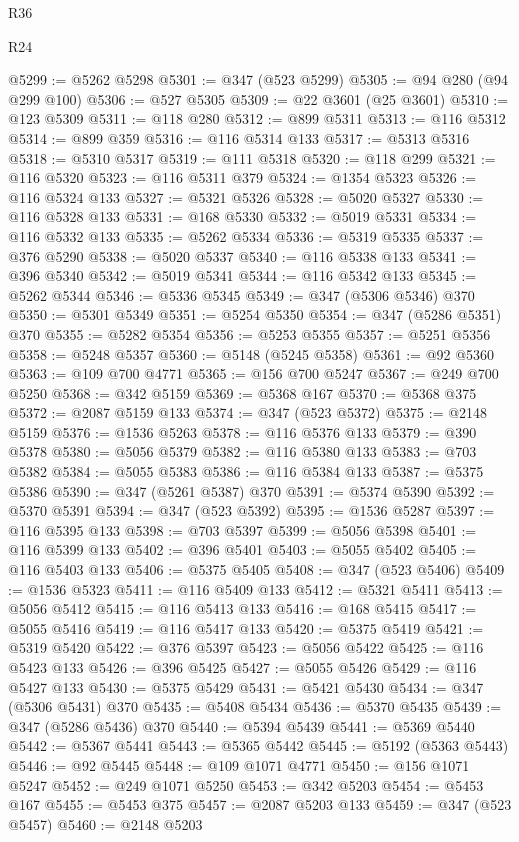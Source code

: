 \begin{lexlean}{R36}
\begin{lexlean}{R24}
\begin{coremodule}
{{{{{{{{{{{{{{{{{{{{{{{{{{{{{{{{{{{{{{{{{{{{{{{{{{{{{{{{{{{{{{{{{{{{{{{{{{{{{{{{{{{{{{{{{{{{{{{{{{{{{{{{{{{{{{{{{{{{{{{{{{{{{{{{{{{{{{{{{{{{{{{{{{{{{{{{{{{{{{{{{{{{{{{{{{{{{{{{{{{{{{{{{{{{{{{{{{{@5299 := @5262 @5298
@5301 := @347 (@523 @5299)
@5305 := @94 @280 (@94 @299 @100)
@5306 := @527 @5305
@5309 := @22 @3601 (@25 @3601)
@5310 := @123 @5309
@5311 := @118 @280
@5312 := @899 @5311
@5313 := @116 @5312
@5314 := @899 @359
@5316 := @116 @5314 @133
@5317 := @5313 @5316
@5318 := @5310 @5317
@5319 := @111 @5318
@5320 := @118 @299
@5321 := @116 @5320
@5323 := @116 @5311 @379
@5324 := @1354 @5323
@5326 := @116 @5324 @133
@5327 := @5321 @5326
@5328 := @5020 @5327
@5330 := @116 @5328 @133
@5331 := @168 @5330
@5332 := @5019 @5331
@5334 := @116 @5332 @133
@5335 := @5262 @5334
@5336 := @5319 @5335
@5337 := @376 @5290
@5338 := @5020 @5337
@5340 := @116 @5338 @133
@5341 := @396 @5340
@5342 := @5019 @5341
@5344 := @116 @5342 @133
@5345 := @5262 @5344
@5346 := @5336 @5345
@5349 := @347 (@5306 @5346) @370
@5350 := @5301 @5349
@5351 := @5254 @5350
@5354 := @347 (@5286 @5351) @370
@5355 := @5282 @5354
@5356 := @5253 @5355
@5357 := @5251 @5356
@5358 := @5248 @5357
@5360 := @5148 (@5245 @5358)
@5361 := @92 @5360
@5363 := @109 @700 @4771
@5365 := @156 @700 @5247
@5367 := @249 @700 @5250
@5368 := @342 @5159
@5369 := @5368 @167
@5370 := @5368 @375
@5372 := @2087 @5159 @133
@5374 := @347 (@523 @5372)
@5375 := @2148 @5159
@5376 := @1536 @5263
@5378 := @116 @5376 @133
@5379 := @390 @5378
@5380 := @5056 @5379
@5382 := @116 @5380 @133
@5383 := @703 @5382
@5384 := @5055 @5383
@5386 := @116 @5384 @133
@5387 := @5375 @5386
@5390 := @347 (@5261 @5387) @370
@5391 := @5374 @5390
@5392 := @5370 @5391
@5394 := @347 (@523 @5392)
@5395 := @1536 @5287
@5397 := @116 @5395 @133
@5398 := @703 @5397
@5399 := @5056 @5398
@5401 := @116 @5399 @133
@5402 := @396 @5401
@5403 := @5055 @5402
@5405 := @116 @5403 @133
@5406 := @5375 @5405
@5408 := @347 (@523 @5406)
@5409 := @1536 @5323
@5411 := @116 @5409 @133
@5412 := @5321 @5411
@5413 := @5056 @5412
@5415 := @116 @5413 @133
@5416 := @168 @5415
@5417 := @5055 @5416
@5419 := @116 @5417 @133
@5420 := @5375 @5419
@5421 := @5319 @5420
@5422 := @376 @5397
@5423 := @5056 @5422
@5425 := @116 @5423 @133
@5426 := @396 @5425
@5427 := @5055 @5426
@5429 := @116 @5427 @133
@5430 := @5375 @5429
@5431 := @5421 @5430
@5434 := @347 (@5306 @5431) @370
@5435 := @5408 @5434
@5436 := @5370 @5435
@5439 := @347 (@5286 @5436) @370
@5440 := @5394 @5439
@5441 := @5369 @5440
@5442 := @5367 @5441
@5443 := @5365 @5442
@5445 := @5192 (@5363 @5443)
@5446 := @92 @5445
@5448 := @109 @1071 @4771
@5450 := @156 @1071 @5247
@5452 := @249 @1071 @5250
@5453 := @342 @5203
@5454 := @5453 @167
@5455 := @5453 @375
@5457 := @2087 @5203 @133
@5459 := @347 (@523 @5457)
@5460 := @2148 @5203
}}}}}}}}}}}}}}}}}}}}}}}}}}}}}}}}}}}}}}}}}}}}}}}}}}}}}}}}}}}}}}}}}}}}}}}}}}}}}}}}}}}}}}}}}}}}}}}}}}}}}}}}}}}}}}}}}}}}}}}}}}}}}}}}}}}}}}}}}}}}}}}}}}}}}}}}}}}}}}}}}}}}}}}}}}}}}}}}}}}}}}}}}}}}}}}}}}}
\end{coremodule}
\end{lexlean}
\end{lexlean}
